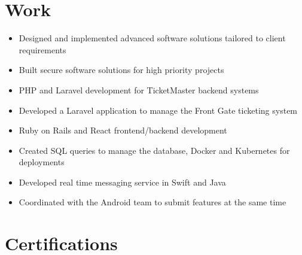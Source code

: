 \documentclass{my_cv}
\begin{document}
\section{Work \faSuitcase}
\begin{itemize}
\item Designed and implemented advanced software solutions tailored to client requirements
\item Built secure software solutions for high priority projects
\end{itemize}
\begin{itemize}
  \item PHP and Laravel
  development for TicketMaster backend systems
\item Developed a Laravel application to manage the Front Gate ticketing system
\end{itemize}
  \begin{itemize}
    \item Ruby on Rails and React 
    frontend/backend development
  \item Created SQL queries to manage the database, Docker and Kubernetes for deployments
  \end{itemize}
\begin{itemize}
  \item Developed real time messaging service in Swift and Java
  \item Coordinated with the Android team to submit features at the same time
\end{itemize}

\section{Certifications }
\end{document}
